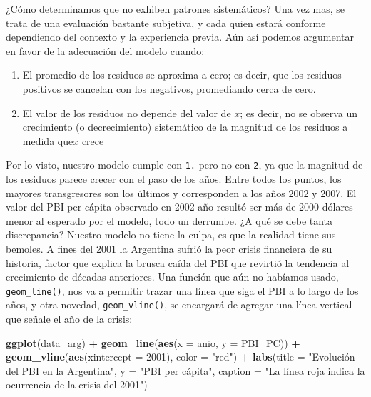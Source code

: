 \documentclass[spanish,]{book}
\newenvironment{Shaded}{\begin{snugshade}}{\end{snugshade}}
\newcommand{\DataTypeTok}[1]{\textcolor[rgb]{0.13,0.29,0.53}{#1}}
\newcommand{\DecValTok}[1]{\textcolor[rgb]{0.00,0.00,0.81}{#1}}
\newcommand{\KeywordTok}[1]{\textcolor[rgb]{0.13,0.29,0.53}{\textbf{#1}}}
\newcommand{\NormalTok}[1]{#1}
\newcommand{\OperatorTok}[1]{\textcolor[rgb]{0.81,0.36,0.00}{\textbf{#1}}}
\newcommand{\StringTok}[1]{\textcolor[rgb]{0.31,0.60,0.02}{#1}}
\providecommand{\tightlist}{%
  \setlength{\itemsep}{0pt}\setlength{\parskip}{0pt}}
\begin{document}
¿Cómo determinamos que no exhiben patrones sistemáticos? Una vez mas, se trata de una evaluación bastante subjetiva, y cada quien estará conforme dependiendo del contexto y la experiencia previa. Aún así podemos argumentar en favor de la adecuación del modelo cuando:

\begin{enumerate}
\def\labelenumi{\arabic{enumi}.}
\tightlist
\item
  El promedio de los residuos se aproxima a cero; es decir, que los residuos positivos se cancelan con los negativos, promediando cerca de cero.
\item
  El valor de los residuos no depende del valor de \(x\); es decir, no se observa un crecimiento (o decrecimiento) sistemático de la magnitud de los residuos a medida que\(x\) crece
\end{enumerate}

Por lo visto, nuestro modelo cumple con \texttt{1.} pero no con \texttt{2}, ya que la magnitud de los residuos parece crecer con el paso de los años. Entre todos los puntos, los mayores transgresores son los últimos y corresponden a los años 2002 y 2007. El valor del PBI per cápita observado en 2002 año resultó ser más de 2000 dólares menor al esperado por el modelo, todo un derrumbe. ¿A qué se debe tanta discrepancia? Nuestro modelo no tiene la culpa, es que la realidad tiene sus bemoles. A fines del 2001 la Argentina sufrió la peor crisis financiera de su historia, factor que explica la brusca caída del PBI que revirtió la tendencia al crecimiento de décadas anteriores. Una función que aún no habíamos usado, \texttt{geom\_line()}, nos va a permitir trazar una línea que siga el PBI a lo largo de los años, y otra novedad, \texttt{geom\_vline()}, se encargará de agregar una línea vertical que señale el año de la crisis:

\begin{Shaded}
\begin{Highlighting}[]
\KeywordTok{ggplot}\NormalTok{(data_arg) }\OperatorTok{+}\StringTok{ }
\StringTok{    }\KeywordTok{geom_line}\NormalTok{(}\KeywordTok{aes}\NormalTok{(}\DataTypeTok{x =}\NormalTok{ anio, }\DataTypeTok{y =}\NormalTok{ PBI_PC)) }\OperatorTok{+}
\StringTok{    }\KeywordTok{geom_vline}\NormalTok{(}\KeywordTok{aes}\NormalTok{(}\DataTypeTok{xintercept =} \DecValTok{2001}\NormalTok{), }\DataTypeTok{color =} \StringTok{"red"}\NormalTok{) }\OperatorTok{+}
\StringTok{    }\KeywordTok{labs}\NormalTok{(}\DataTypeTok{title =} \StringTok{"Evolución del PBI en la Argentina"}\NormalTok{,}
         \DataTypeTok{y =} \StringTok{"PBI per cápita"}\NormalTok{,}
         \DataTypeTok{caption =} \StringTok{"La línea roja indica la ocurrencia de la crisis del 2001"}\NormalTok{)}
\end{Highlighting}
\end{Shaded}
\end{document}
